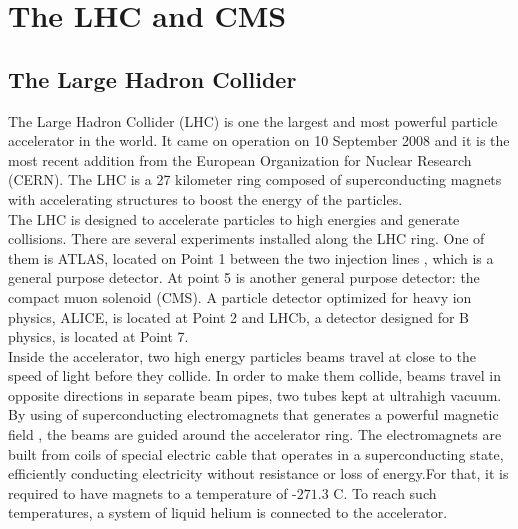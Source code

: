 
\chapter{The LHC and CMS}

\section{The Large Hadron Collider}

The Large Hadron Collider (LHC) is one the  largest and most powerful particle accelerator in the world. It came on operation on 10 September 2008 and it is the most recent addition from the  European Organization for Nuclear Research (CERN).  The LHC is a 27 kilometer ring composed of  superconducting magnets with accelerating structures to boost the energy of the particles. \\

The LHC is designed to accelerate particles to high energies and generate collisions. There are several
experiments installed along the LHC ring. One of them is ATLAS, located on Point 1 between the two injection lines , which is a general purpose detector. At point 5 is another general purpose detector: the compact muon solenoid  (CMS). A particle detector optimized for heavy ion physics, ALICE, is located at Point 2 and LHCb, a detector designed for B physics, is located at Point 7.\cite{cern1,cern2}
\\

Inside the accelerator, two high energy particles beams travel at
close to the speed of light before they collide. 
In order to make them collide, beams travel in opposite directions in separate beam pipes, 
two tubes kept at ultrahigh vacuum. 
By using of superconducting electromagnets that generates a powerful magnetic field , the beams are guided around the accelerator ring. 
The electromagnets are built from coils of special electric cable that operates in a superconducting state, efficiently conducting electricity without resistance or loss of energy.For that, it is required to have  magnets to a temperature of  $‑271.3$ C. 
To reach such temperatures, a system of liquid helium is connected to the accelerator.\cite{cern2}

